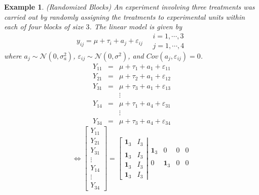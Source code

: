 \documentclass{article}
\newtheorem{example}[theorem]{Example}
\begin{document}
\begin{example}
(Randomized Blocks) An experiment involving three treatments was carried out
by randomly assigning the treatments to experimental units within each of
four blocks of size $3$. The linear model is given by 
\begin{equation*}
y_{ij}=\mu +\tau _{i}+a_{j}+\varepsilon _{ij}\quad 
\begin{array}{c}
i=1,\cdots ,3 \\ 
j=1,\cdots ,4%
\end{array}%
\end{equation*}%
where $a_{j}\sim \mathcal{N}\left( 0,\sigma _{a}^{2}\right) $, $\varepsilon
_{ij}\sim \mathcal{N}\left( 0,\sigma ^{2}\right) $, and $Cov\left(
a_{j},\varepsilon _{ij}\right) =0$.%
\begin{eqnarray*}
Y_{11} &=&\mu +\tau _{1}+a_{1}+\varepsilon _{11} \\
Y_{21} &=&\mu +\tau _{2}+a_{1}+\varepsilon _{12} \\
Y_{31} &=&\mu +\tau _{3}+a_{1}+\varepsilon _{13} \\
&&\vdots \\
Y_{14} &=&\mu +\tau _{1}+a_{4}+\varepsilon _{31} \\
&&\vdots \\
Y_{34} &=&\mu +\tau _{3}+a_{4}+\varepsilon _{34}
\end{eqnarray*}%
\begin{equation*}
\Leftrightarrow \left[ 
\begin{array}{c}
Y_{11} \\ 
Y_{21} \\ 
Y_{31} \\ 
\vdots \\ 
Y_{14} \\ 
\vdots \\ 
Y_{34}%
\end{array}%
\right] =\left[ 
\begin{array}{cc}
\boldsymbol{1}_{3} & I_{3} \\ 
&  \\ 
\boldsymbol{1}_{3} & I_{3} \\ 
\boldsymbol{1}_{3} & I_{3} \\ 
\boldsymbol{1}_{3} & I_{3}%
\end{array}%
\right\vert \left. 
\begin{array}{cccc}
\boldsymbol{1}_{3} & 0 & 0 & 0 \\ 
&  &  &  \\ 
0 & \boldsymbol{1}_{3} & 0 & 0 \\ 

\end{array}
\end{equation*}
\end{example}
\end{document}
